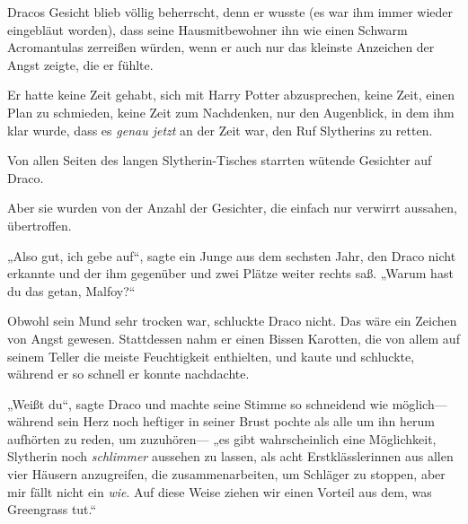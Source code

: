 Dracos Gesicht blieb völlig beherrscht, denn er wusste (es war ihm immer wieder eingebläut worden), dass seine Hausmitbewohner ihn wie einen Schwarm Acromantulas zerreißen würden, wenn er auch nur das kleinste Anzeichen der Angst zeigte, die er fühlte.

Er hatte keine Zeit gehabt, sich mit Harry Potter abzusprechen, keine Zeit, einen Plan zu schmieden, keine Zeit zum Nachdenken, nur den Augenblick, in dem ihm klar wurde, dass es \emph{genau jetzt} an der Zeit war, den Ruf Slytherins zu retten.

Von allen Seiten des langen Slytherin-Tisches starrten wütende Gesichter auf Draco.

Aber sie wurden von der Anzahl der Gesichter, die einfach nur verwirrt aussahen, übertroffen.

„Also gut, ich gebe auf“, sagte ein Junge aus dem sechsten Jahr, den Draco nicht erkannte und der ihm gegenüber und zwei Plätze weiter rechts saß. „Warum hast du das getan, Malfoy?“

Obwohl sein Mund sehr trocken war, schluckte Draco nicht. Das wäre ein Zeichen von Angst gewesen. Stattdessen nahm er einen Bissen Karotten, die von allem auf seinem Teller die meiste Feuchtigkeit enthielten, und kaute und schluckte, während er so schnell er konnte nachdachte.

„Weißt du“, sagte Draco und machte seine Stimme so schneidend wie möglich—während sein Herz noch heftiger in seiner Brust pochte als alle um ihn herum aufhörten zu reden, um zuzuhören— „es gibt wahrscheinlich eine Möglichkeit, Slytherin noch \emph{schlimmer} aussehen zu lassen, als acht Erstklässlerinnen aus allen vier Häusern anzugreifen, die zusammenarbeiten, um Schläger zu stoppen, aber mir fällt nicht ein \emph{wie}. Auf diese Weise ziehen wir einen Vorteil aus dem, was Greengrass tut.“

